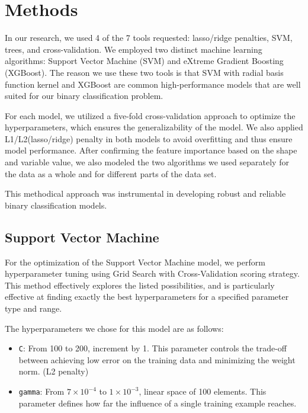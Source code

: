 \documentclass{article}
\begin{document}
\section{Methods}

In our research, we used 4 of the 7 tools requested: lasso/ridge penalties, SVM, trees, and cross-validation. We employed two distinct machine learning algorithms: Support Vector Machine (SVM) and eXtreme Gradient Boosting (XGBoost). The reason we use these two tools is that SVM with radial basis function kernel and XGBoost are common high-performance models that are well suited for our binary classification problem.

For each model, we utilized a five-fold cross-validation approach to optimize the hyperparameters, which ensures the generalizability of the model. We also applied L1/L2(lasso/ridge) penalty in both models to avoid overfitting and thus ensure model performance. After confirming the feature importance based on the shape and variable value, we also modeled the two algorithms we used separately for the data as a whole and for different parts of the data set.

This methodical approach was instrumental in developing robust and reliable binary classification models.

\subsection{Support Vector Machine}

For the optimization of the Support Vector Machine model, we perform hyperparameter tuning using Grid Search with Cross-Validation scoring strategy. This method effectively explores the listed possibilities, and is particularly effective at finding exactly the best hyperparameters for a specified parameter type and range.

The hyperparameters we chose for this model are as follows:

\begin{itemize}
    \item \texttt{C}: From 100 to 200, increment by 1. This parameter controls the trade-off between achieving low error on the training data and minimizing the weight norm. (L2 penalty)
    \item \texttt{gamma}: From $7 \times 10^{-4}$ to $1 \times 10^{-3}$, linear space of 100 elements. This parameter defines how far the influence of a single training example reaches.
\end{itemize}
\end{document}
